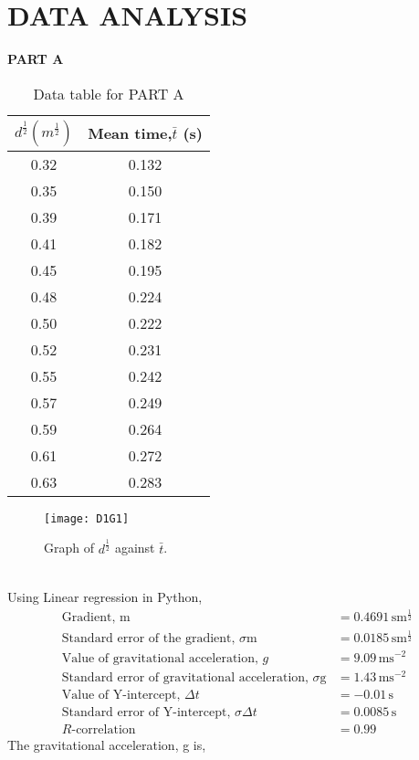 \documentclass[a4paper,11pt]{article}
\begin{document}
\section*{\center DATA ANALYSIS}
\label{sec:DATA ANALYSIS}
\noindent \textbf{PART A}
\begin{table}[h!]
\centering
\begin{tabular}{ |c|c| } 
\hline
$d^\frac{1}{2} (m^{\frac{1}{2}})$ & Mean time,$\bar t$ (s)\\
\hline
0.32 & 0.132 \\
0.35 & 0.150 \\
0.39 & 0.171 \\
0.41 & 0.182 \\
0.45 & 0.195 \\
0.48 & 0.224 \\
0.50 & 0.222 \\
0.52 & 0.231 \\
0.55 & 0.242 \\
0.57 & 0.249 \\
0.59 & 0.264 \\
0.61 & 0.272 \\
0.63 & 0.283 \\
\hline
\end{tabular}
\caption{Data table for PART A}
\label{table:1}
\end{table}
\begin{figure}[ht]
    \centering
    \texttt{[image: D1G1]}
    \caption{Graph of $d^\frac{1}{2}$ against $\bar t$.}
    \label{fig:setupC}
\end{figure}
\\Using Linear regression in Python,
\begin{align*}
\text{Gradient, m} &=  0.4691 \, \text{s}\text{m}^{\frac{1}{2}} \\
\text{Standard error of the gradient, $\sigma$m}&= 0.0185 \, \text{s}\text{m}^{\frac{1}{2}} \\
\text{Value of gravitational acceleration, } g&= 9.09 \, \text{m}\text{s}^{-2} \\
\text{Standard error of gravitational acceleration, $\sigma$g}&= 1.43 \,\text{m}\text{s}^{-2}\\
\text{Value of Y-intercept, } \Delta t&=  -0.01 \, \text{s} \\
\text{Standard error of Y-intercept, } \sigma\Delta t&=  0.0085 \, \text{s} \\
R\text{-correlation} &= 0.99
\end{align*}
The gravitational acceleration, g is,
\end{document}
